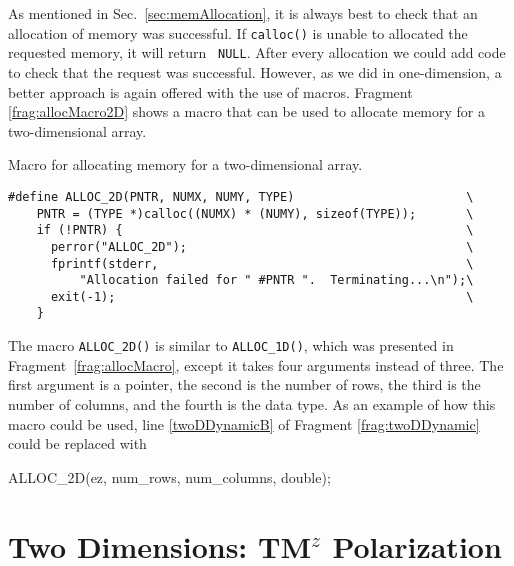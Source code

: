 As mentioned in Sec.\ \ref{sec:memAllocation}, it is always best to
check that an allocation of memory was successful.  If {\tt calloc()}
is unable to allocated the requested memory, it will return {\tt
NULL}.  After every allocation we could add code to check that the
request was successful.  However, as we did in one-dimension, a better
approach is again offered with the use of macros.  Fragment
\ref{frag:allocMacro2D} shows a macro that can be used to allocate
memory for a two-dimensional array.

\begin{fragment}
Macro for allocating memory for a two-dimensional array. 
\label{frag:allocMacro2D}
\codemiddle
\begin{lstlisting}
#define ALLOC_2D(PNTR, NUMX, NUMY, TYPE)                        \
    PNTR = (TYPE *)calloc((NUMX) * (NUMY), sizeof(TYPE));       \
    if (!PNTR) {                                                \
      perror("ALLOC_2D");                                       \
      fprintf(stderr,                                           \
          "Allocation failed for " #PNTR ".  Terminating...\n");\
      exit(-1);                                                 \
    }
\end{lstlisting}
\end{fragment}
The macro {\tt ALLOC\_2D()} is similar to {\tt ALLOC\_1D()}, which was
presented in Fragment\ \ref{frag:allocMacro}, except it takes four
arguments instead of three.  The first argument is a pointer, the
second is the number of rows, the third is the number of columns, and
the fourth is the data type.  As an example of how this macro could be
used, line \ref{twoDDynamicB} of Fragment
\ref{frag:twoDDynamic} could be replaced with
\begin{code}
  ALLOC_2D(ez, num_rows, num_columns, double);
\end{code}

\section{Two Dimensions: TM$^z$ Polarization \label{sec:tmzPolarization}}

